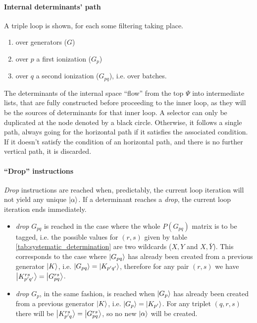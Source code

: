 \documentclass[./thesis.tex]{subfiles}
\begin{document}
\paragraph{Internal determinants' path}
 
A triple loop is shown, for each some filtering taking place.

\begin{enumerate}
\item
over generators ($G$)
\item
over $p$ a first ionization ($G_p$)
\item
over $q$ a second ionization ($G_{pq}$), i.e. over batches.
\end{enumerate}

The determinants of the internal space ``flow'' from the top $\Psi$ into intermediate lists, that are fully constructed before proceeding to the inner loop, as they will be the sources of determinants for that inner loop.
A selector can only be duplicated at the node denoted by a black circle. Otherwise, it follows a single path, always going for the horizontal path if it satisfies the associated condition.
If it doesn't satisfy the condition of an horizontal path, and there is no further vertical path, it is discarded.

\paragraph{``Drop'' instructions}
\emph{Drop} instructions are reached when, predictably, the current loop iteration will not yield any unique ${\ket{\alpha}}$. If a determinant reaches a \emph{drop}, the current loop iteration ends immediately.

\begin{itemize}
\item
\emph{drop} $G_{pq}$ is reached in the case where the whole $P(G_{pq})$ matrix is to be tagged, i.e. the possible values for $(r,s)$ given by table \ref{tab:systematic_determination} are two wildcards ($X,Y$ and $X,\bar Y$).
This corresponds to the case where $\ket {G_{pq}}$ has already been created from a previous generator $\ket K$, i.e. $\ket {G_{pq}} = \ket {K_{p'q'}}$, therefore for any pair $(r,s)$ we have $\ket {K_{p'q'}^{rs}} = \ket {G_{pq}^{rs}}$.\\
\item
\emph{drop} $G_{p}$, in the same fashion, is reached when $\ket {G_{p}}$ has already been created from a previous generator $\ket K$, i.e. $\ket {G_{p}} = \ket{K_{p'}}$. For any triplet $(q,r,s)$ there will be $\ket {K_{p'q}^{rs}} = \ket {G_{pq}^{rs}}$, so no new ${\ket{\alpha}}$ will be created.
\end{itemize}
\end{document}
